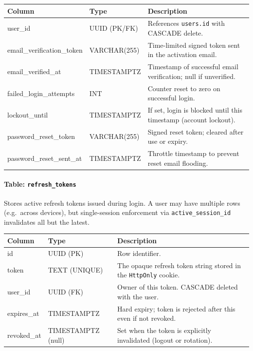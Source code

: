 \begin{longtable}{|p{4.5cm}|p{3cm}|p{6cm}|}
\hline \textbf{Column} & \textbf{Type} & \textbf{Description} \\ \hline
user\_id & UUID (PK/FK) & References \texttt{users.id} with CASCADE delete. \\ \hline
email\_verification\_token & VARCHAR(255) & Time-limited signed token sent in the activation email. \\ \hline
email\_verified\_at & TIMESTAMPTZ & Timestamp of successful email verification; null if unverified. \\ \hline
failed\_login\_attempts & INT & Counter reset to zero on successful login. \\ \hline
lockout\_until & TIMESTAMPTZ & If set, login is blocked until this timestamp (account lockout). \\ \hline
password\_reset\_token & VARCHAR(255) & Signed reset token; cleared after use or expiry. \\ \hline
password\_reset\_sent\_at & TIMESTAMPTZ & Throttle timestamp to prevent reset email flooding. \\ \hline
\end{longtable}

\paragraph{Table: \texttt{refresh\_tokens}}
Stores active refresh tokens issued during login. A user may have multiple rows (e.g.\ across devices), but single-session enforcement via \texttt{active\_session\_id} invalidates all but the latest.

\begin{longtable}{|p{4.2cm}|p{3cm}|p{6.8cm}|}
\hline \textbf{Column} & \textbf{Type} & \textbf{Description} \\ \hline
id & UUID (PK) & Row identifier. \\ \hline
token & TEXT (UNIQUE) & The opaque refresh token string stored in the \texttt{HttpOnly} cookie. \\ \hline
user\_id & UUID (FK) & Owner of this token. CASCADE deleted with the user. \\ \hline
expires\_at & TIMESTAMPTZ & Hard expiry; token is rejected after this even if not revoked. \\ \hline
revoked\_at & TIMESTAMPTZ (null) & Set when the token is explicitly invalidated (logout or rotation). \\ \hline
\end{longtable}


